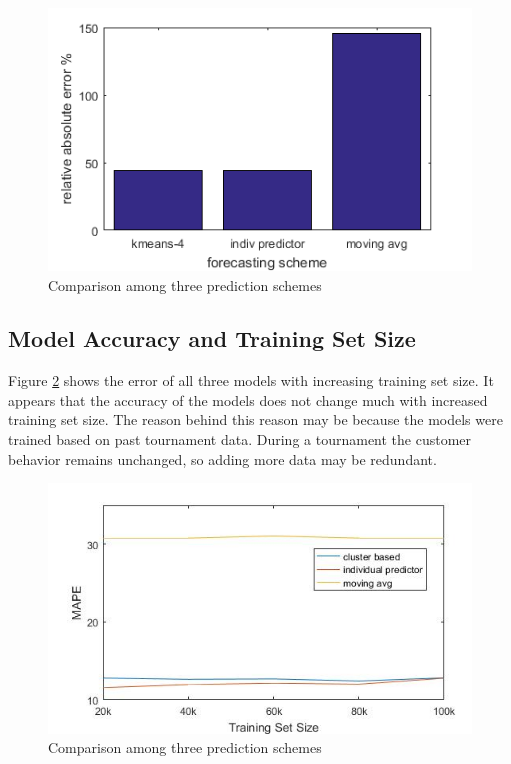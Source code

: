 \begin{figure}[h!]
\centering
\begin{minipage}{.5\textwidth}
  \centering
  \includegraphics[width=\linewidth]{final-relative-abs-error.png}
  \caption{Comparison among three prediction schemes}
  \label{fig:prediction-scheme-vs-error}
\end{minipage}
  
\end{figure}

\subsection{Model Accuracy and Training Set Size}
Figure \ref{fig:trainset-vs-error} shows the error of all three models with increasing training set size. It appears that the accuracy of the models does not change much with increased training set size. The reason behind this reason may be because the models were trained based on past tournament data. During a tournament the customer behavior remains unchanged, so adding more data may be redundant. 

\begin{figure}[h!]
  \centering
  \includegraphics[width=\linewidth]{error-change-training-size.jpg}
  \caption{Comparison among three prediction schemes}
  \label{fig:trainset-vs-error}
\end{figure}
